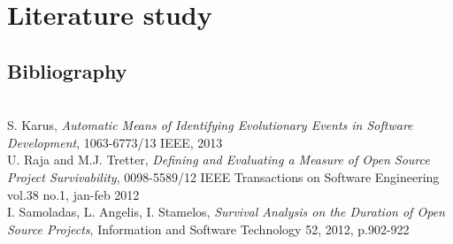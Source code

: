 \section{Literature study}

\subsection{Bibliography}
\begingroup
\renewcommand{\section}[2]{}%
\begin{thebibliography}{99}
	 \hfill \\ S. Karus, \emph{Automatic Means of
	Identifying Evolutionary Events in Software Development}, 1063-6773/13 IEEE,
	2013
	 \hfill \\ U. Raja and M.J. Tretter,
	\emph{Defining and Evaluating a Measure of Open Source Project Survivability},
	0098-5589/12 IEEE Transactions on Software Engineering vol.38 no.1, jan-feb
	2012
	 \hfill \\ I. Samoladas, L. Angelis, I.
	Stamelos, \emph{Survival Analysis on the Duration of Open Source Projects},
	Information and Software Technology 52, 2012, p.902-922
\end{thebibliography}
\endgroup
